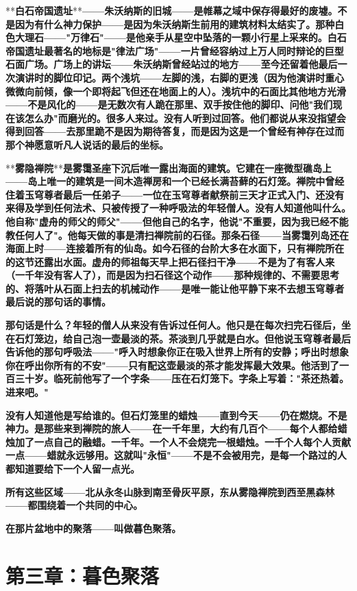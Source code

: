 \documentclass[12pt,a4paper,openany]{ctexbook}
\begin{document}
**\textbf{白石帝国遗址}**\textbf{——朱沃纳斯的旧城——是帷幕之域中保存得最好的废墟。不是因为有什么神力保护——是因为朱沃纳斯生前用的建筑材料太结实了。那种白色大理石——"万律石"——是他亲手从星空中坠落的一颗小行星上采来的。白石帝国遗址最著名的地标是"律法广场"——一片曾经容纳过上万人同时辩论的巨型石面广场。广场上的讲坛——朱沃纳斯曾经站过的地方——至今还留着他最后一次演讲时的脚位印记。两个浅坑——左脚的浅，右脚的更浅（因为他演讲时重心微微向前倾，像一个即将起飞但还在地面上的人）。浅坑中的石面比其他地方光滑——不是风化的——是无数次有人跪在那里、双手按住他的脚印、问他"我们现在该怎么办"而磨光的。很多人来过。没有人听到过回答。他们都说从来没指望会得到回答——去那里跪不是因为期待答复，而是因为这是一个曾经有神存在过而那个神愿意听凡人说话的最后的坐标。}


**\textbf{雾隐禅院}**\textbf{是雾霭圣座下沉后唯一露出海面的建筑。它建在一座微型礁岛上——岛上唯一的建筑是一间木造禅房和一个已经长满苔藓的石灯笼。禅院中曾经住着玉穹尊者最后一任弟子——一位在玉穹尊者献祭前三天才正式入门、还没有来得及学到任何法术、只被传授了一种呼吸法的年轻僧人。没有人知道他叫什么。他自称"虚舟的师父的师父"——但他自己的名字，他说"不重要，因为我已经不能教任何人了"。他每天做的事是清扫禅院前的石径。那条石径——当雾霭列岛还在海面上时——连接着所有的仙岛。如今石径的台阶大多在水面下，只有禅院所在的这节还露出水面。虚舟的师祖每天早上把石径扫干净——不是为了有客人来（一千年没有客人了），而是因为扫石径这个动作——那种规律的、不需要思考的、将落叶从石面上扫去的机械动作——是唯一能让他平静下来不去想玉穹尊者最后说的那句话的事情。}


\textbf{那句话是什么？年轻的僧人从来没有告诉过任何人。他只是在每次扫完石径后，坐在石灯笼边，给自己泡一壶最淡的茶。茶淡到几乎就是白水。但他说玉穹尊者最后告诉他的那句呼吸法——"呼入时想象你正在吸入世界上所有的安静；呼出时想象你在呼出你所有的不安"——只有配这壶最淡的茶才能发挥最大效果。他活到了一百三十岁。临死前他写了一个字条——压在石灯笼下。字条上写着："茶还热着。进来吧。"}


\textbf{没有人知道他是写给谁的。但石灯笼里的蜡烛——直到今天——仍在燃烧。不是神力。是那些来到禅院的旅人——在一千年里，大约有几百个——每个人都给蜡烛加了一点自己的融蜡。一千年。一个人不会烧完一根蜡烛。一千个人每个人贡献一点——蜡就永远够用。这就叫"永恒"——不是不会被用完，是每一个路过的人都知道要给下一个人留一点光。}


\textbf{所有这些区域——北从永冬山脉到南至骨灰平原，东从雾隐禅院到西至黑森林——都围绕着一个共同的中心。}


\textbf{在那片盆地中的聚落——叫做暮色聚落。}


\section*{第三章：暮色聚落}
\end{document}
